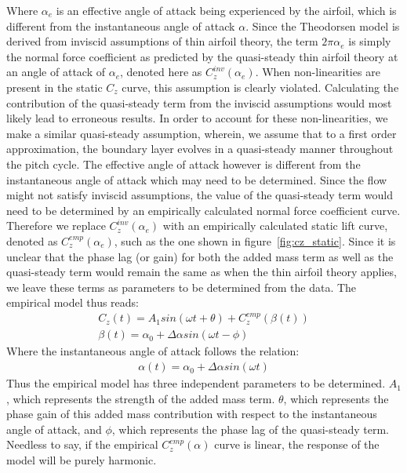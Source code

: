 Where $\alpha_{e}$ is an effective angle of attack being experienced by the airfoil, which is different from the instantaneous angle of attack $\alpha$. Since the Theodorsen model is derived from inviscid assumptions of thin airfoil theory, the term $2\pi\alpha_{e}$ is simply the normal force coefficient as predicted by the quasi-steady thin airfoil theory at an angle of attack of $\alpha_{e}$, denoted here as $C_{z}^{inv}(\alpha_{e})$. When non-linearities are present in the static $C_{z}$ curve, this assumption is clearly violated. Calculating the contribution of the quasi-steady term from the inviscid assumptions would most likely lead to erroneous results. In order to account for these non-linearities, we make a similar quasi-steady assumption, wherein, we assume that to a first order approximation, the boundary layer evolves in a quasi-steady manner throughout the pitch cycle. The effective angle of attack however is different from the instantaneous angle of attack which may need to be determined. Since the flow might not satisfy inviscid assumptions, the value of the quasi-steady term would need to be determined by an empirically calculated normal force coefficient curve. Therefore we replace $C^{inv}_{z}(\alpha_{e})$ with an empirically calculated static lift curve, denoted as $C^{emp}_{z}(\alpha_{e})$, such as the one shown in figure~\ref{fig:cz_static}. Since it is unclear that the phase lag (or gain) for both the added mass term as well as the quasi-steady term would remain the same as when the thin airfoil theory applies, we leave these terms as parameters to be determined from the data. The empirical model thus reads:
\begin{align}
	\label{eqn:phase_lag_model}
	C_{z}(t) = A_{1}sin(\omega t + \theta) + C^{emp}_{z}(\beta(t)) \\
	\beta(t) = \alpha_{0} + \Delta\alpha sin(\omega t - \phi) \nonumber
\end{align}
Where the instantaneous angle of attack follows the relation:
\begin{align}
	\alpha(t) = \alpha_{0} + \Delta\alpha sin(\omega t)
\end{align}
Thus the empirical model has three independent parameters to be determined. $A_{1}$, which represents the strength of the added mass term. $\theta$, which represents the phase gain of this added mass contribution with respect to the instantaneous angle of attack, and $\phi$, which represents the phase lag of the quasi-steady term. Needless to say, if the empirical $C^{emp}_{z}(\alpha)$ curve is linear, the response of the model will be purely harmonic.

